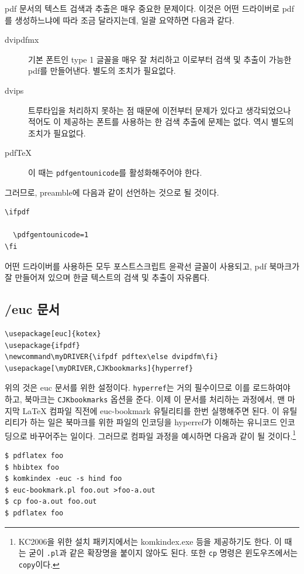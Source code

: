 pdf 문서의 텍스트 검색과 추출은 매우 중요한 문제이다.
이것은 어떤 드라이버로 pdf를 생성하느냐에 따라 조금 달라지는데, 일괄
요약하면 다음과 같다.
\begin{description}
\item[dvipdfmx] 기본 폰트인 type 1 글꼴을 매우 잘 처리하고
이로부터 검색 및 추출이 가능한 pdf를 만들어낸다. 별도의 조치가
필요없다.
\item[dvips] 트루타입을 처리하지 못하는 점 때문에 이전부터
문제가 있다고 생각되었으나 적어도 \kotex 이 제공하는 폰트를 사용하는 한
검색 추출에 문제는 없다. 역시 별도의 조치가 필요없다.
\item[pdf\TeX] 이 때는 \texttt{\bs pdfgentounicode}를
활성화해주어야 한다.
\end{description}
그러므로, preamble에 다음과 같이 선언하는 것으로 될 것이다.
\begin{verbatim}
\ifpdf
  
  \pdfgentounicode=1
\fi
\end{verbatim}

어떤 드라이버를 사용하든 모두 포스트스크립트 윤곽선 글꼴이 사용되고,
pdf 북마크가 잘 만들어져 있으며 한글 텍스트의 검색 및 추출이 자유롭다.


\subsection{\kotex/euc 문서}

\euc\begin{verbatim}
\usepackage[euc]{kotex}
\usepackage{ifpdf}
\newcommand\myDRIVER{\ifpdf pdftex\else dvipdfm\fi}
\usepackage[\myDRIVER,CJKbookmarks]{hyperref}
\end{verbatim}

위의 것은 euc 문서를 위한 설정이다. \texttt{hyperref}는 거의 필수이므로
이를 로드하여야 하고, 북마크는 \texttt{CJKbookmarks} 옵션을 준다. 
이제 이 문서를 처리하는 과정에서, 맨 마지막 \LaTeX{} 컴파일
직전에 euc-bookmark 유틸리티를 한번 실행해주면 된다. 이 유틸리티가
하는 일은 북마크를 위한 파일의 인코딩을 hyperref가 이해하는 유니코드
인코딩으로 바꾸어주는 일이다. 그러므로 컴파일 과정을 예시하면 다음과 같이
될 것이다.\footnote{%
  KC2006을 위한 설치 패키지에서는 komkindex.exe 등을
  제공하기도 한다. 이 때는 굳이 \texttt{.pl}과 같은
  확장명을 붙이지 않아도 된다. 또한 \texttt{cp} 명령은
  윈도우즈에서는 \texttt{copy}이다.}

\begin{verbatim}
$ pdflatex foo
$ hbibtex foo
$ komkindex -euc -s hind foo
$ euc-bookmark.pl foo.out >foo-a.out
$ cp foo-a.out foo.out
$ pdflatex foo
\end{verbatim}

